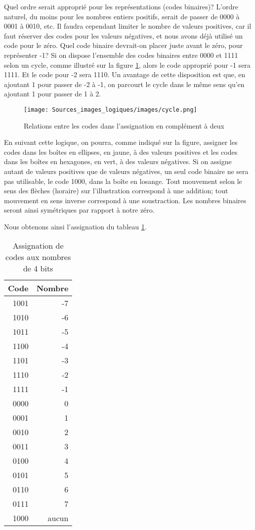 \documentclass[letter, oneside]{book}
\begin{document}
Quel ordre serait approprié pour les représentations (codes binaires)?
L'ordre naturel, du moins pour les nombres entiers positifs, serait de
passer de 0000 à 0001 à 0010, etc. Il faudra cependant limiter le
nombre de valeurs positives, car il faut réserver des codes pour les
valeurs négatives, et nous avons déjà utilisé un code pour le
zéro. Quel code binaire devrait-on placer juste avant le zéro, pour
représenter -1? Si on dispose l'ensemble des codes binaires entre 0000
et 1111 selon un cycle, comme illustré sur la figure
\ref{fig:org93e534f}, alors le code approprié pour -1 sera 1111. Et le
code pour -2 sera 1110. Un avantage de cette disposition est que, en
ajoutant 1 pour passer de -2 à -1, on parcourt le cycle dans le même
sens qu'en ajoutant 1 pour passer de 1 à 2.

\begin{figure}[htbp]
\centering
\texttt{[image: Sources\_images\_logiques/images/cycle.png]}
\caption{\label{fig:org93e534f}Relations entre les codes dans l'assignation en complément à deux}
\end{figure}

En suivant cette logique, on pourra, comme indiqué sur la figure,
assigner les codes dans les boîtes en ellipses, en jaune, à des
valeurs positives et les codes dans les boîtes en hexagones, en vert,
à des valeurs négatives. Si on assigne autant de valeurs positives que
de valeurs négatives, un seul code binaire ne sera pas utilisable, le
code 1000, dans la boîte en losange. Tout mouvement selon le sens des
flèches (horaire) sur l'illustration correspond à une addition;
tout mouvement en sens inverse correspond à une soustraction. Les nombres
binaires seront ainsi symétriques par rapport à notre zéro.

Nous obtenons ainsi l'assignation du tableau \ref{tab:org7482407}.

\begin{table}[htbp]
\caption{\label{tab:org7482407}Assignation de codes aux nombres de 4 bits}
\centering
\begin{tabular}{rr}
Code & Nombre\\[0pt]
\hline
1001 & -7\\[0pt]
1010 & -6\\[0pt]
1011 & -5\\[0pt]
1100 & -4\\[0pt]
1101 & -3\\[0pt]
1110 & -2\\[0pt]
1111 & -1\\[0pt]
0000 & 0\\[0pt]
0001 & 1\\[0pt]
0010 & 2\\[0pt]
0011 & 3\\[0pt]
0100 & 4\\[0pt]
0101 & 5\\[0pt]
0110 & 6\\[0pt]
0111 & 7\\[0pt]
1000 & aucun\\[0pt]
\end{tabular}
\end{table}
\end{document}

